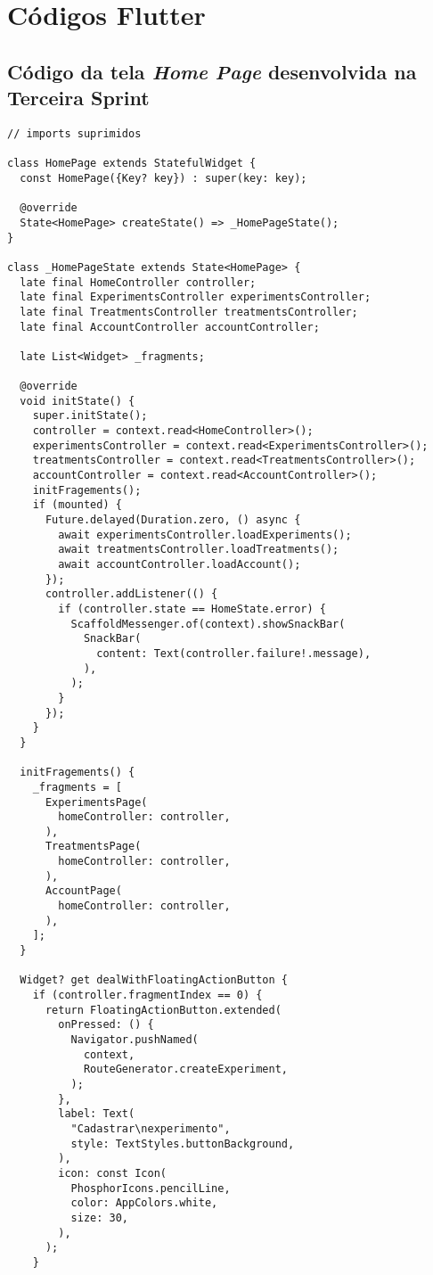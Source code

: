 \chapter{Códigos Flutter}\label{ch:codigosFlutter}

\section{Código da tela \textit{Home Page} desenvolvida na Terceira Sprint}\label{code:home-sprint3}
\begin{code}
\begin{verbatim}
// imports suprimidos

class HomePage extends StatefulWidget {
  const HomePage({Key? key}) : super(key: key);

  @override
  State<HomePage> createState() => _HomePageState();
}

class _HomePageState extends State<HomePage> {
  late final HomeController controller;
  late final ExperimentsController experimentsController;
  late final TreatmentsController treatmentsController;
  late final AccountController accountController;

  late List<Widget> _fragments;

  @override
  void initState() {
    super.initState();
    controller = context.read<HomeController>();
    experimentsController = context.read<ExperimentsController>();
    treatmentsController = context.read<TreatmentsController>();
    accountController = context.read<AccountController>();
    initFragements();
    if (mounted) {
      Future.delayed(Duration.zero, () async {
        await experimentsController.loadExperiments();
        await treatmentsController.loadTreatments();
        await accountController.loadAccount();
      });
      controller.addListener(() {
        if (controller.state == HomeState.error) {
          ScaffoldMessenger.of(context).showSnackBar(
            SnackBar(
              content: Text(controller.failure!.message),
            ),
          );
        }
      });
    }
  }

  initFragements() {
    _fragments = [
      ExperimentsPage(
        homeController: controller,
      ),
      TreatmentsPage(
        homeController: controller,
      ),
      AccountPage(
        homeController: controller,
      ),
    ];
  }

  Widget? get dealWithFloatingActionButton {
    if (controller.fragmentIndex == 0) {
      return FloatingActionButton.extended(
        onPressed: () {
          Navigator.pushNamed(
            context,
            RouteGenerator.createExperiment,
          );
        },
        label: Text(
          "Cadastrar\nexperimento",
          style: TextStyles.buttonBackground,
        ),
        icon: const Icon(
          PhosphorIcons.pencilLine,
          color: AppColors.white,
          size: 30,
        ),
      );
    }


\end{verbatim}
\end{code}
